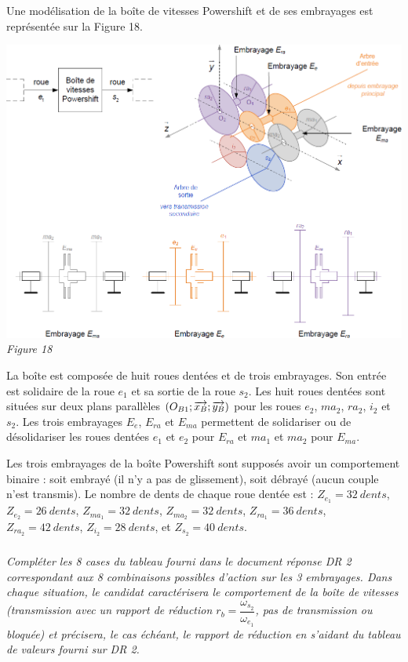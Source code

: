 \documentclass[10pt,fleqn]{article} %
\begin{document}
Une modélisation de la boîte de vitesses Powershift et de ses embrayages est représentée sur la 
Figure 18.


\begin{center}
\includegraphics[width=1.\linewidth]{images/fig_18}
\textit{Figure 18}
\end{center}

La boîte est composée de huit roues dentées et de trois embrayages. Son entrée est solidaire de la roue $e_1$ et sa sortie de la roue $s_2$. Les huit roues dentées sont situées sur deux plans parallèles $\left(O_{B1}; \overrightarrow{x_B}; \overrightarrow{y_B}  \right)$ pour les roues $e_2$, $ma_2$, $ra_2$, $i_2$ et $s_2$. Les trois embrayages $E_e$, $E_{ra}$ et $E_{ma}$ permettent de solidariser ou de désolidariser les roues dentées $e_1$ et $e_2$  pour $E_{ra}$ et $ma_1$ et $ma_2$ pour $E_{ma}$.

Les trois embrayages de la boîte Powershift sont supposés avoir un comportement binaire : soit embrayé (il n’y a pas de glissement), soit débrayé (aucun couple n’est transmis).
Le nombre de dents de chaque roue dentée est :
$Z_{e_1} =\SI{32}{dents}$, 
$Z_{e_2} =\SI{26}{dents}$, 
$Z_{ma_1} =\SI{32}{dents}$, 
$Z_{ma_2} =\SI{32}{dents}$, 
$Z_{ra_1} =\SI{36}{dents}$, 
$Z_{ra_2} =\SI{42}{dents}$, 
$Z_{i_2} =\SI{28}{dents}$, 
et $Z_{s_2} =\SI{40}{dents}$.




\subparagraph{}
\textit{Compléter les 8 cases du tableau fourni dans le document réponse DR 2 correspondant aux 8 combinaisons possibles d’action sur les 3 embrayages. Dans chaque situation, le candidat caractérisera le comportement de la boîte de vitesses (transmission avec un rapport de réduction $r_b=\dfrac{\omega_{s_2}}{\omega_{e_1}}$, pas de transmission ou bloquée) et précisera, le cas échéant, le rapport de réduction en s’aidant du tableau de valeurs fourni sur DR 2.}
\end{document}

